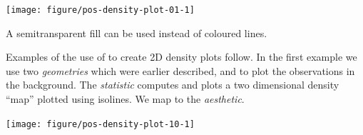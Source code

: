 \documentclass[krantz2]{krantz}\usepackage{knitr}%
\begin{document}
\begin{knitrout}\footnotesize
{}\color{fgcolor}\begin{kframe}
\begin{alltt}
    \hlopt{+}
  \hlstd{()}
\end{alltt}
\end{kframe}

{\centering \texttt{[image: figure/pos-density-plot-01-1]} 

}



\end{knitrout}

A semitransparent fill can be used instead of coloured lines.

\begin{knitrout}\footnotesize
{}\color{fgcolor}\begin{kframe}
\begin{alltt}
    \hlopt{+}
  \hlstd{(} \hlstd{=} \hlstd{)}
\end{alltt}
\end{kframe}
\end{knitrout}


Examples of the use of  to create 2D density plots follow. In the first example we use two \emph{geometries} which were earlier described,  and  to plot the observations in the background. The \emph{statistic} computes and plots a two dimensional density ``map'' plotted using isolines. We map  to the  \emph{aesthetic}.

\begin{knitrout}\footnotesize
{}\color{fgcolor}\begin{kframe}
\begin{alltt}
    \hlopt{+}
  \hlstd{()} \hlopt{+}
  \hlstd{()} \hlopt{+}
  \hlstd{()}
\end{alltt}
\end{kframe}

{\centering \texttt{[image: figure/pos-density-plot-10-1]} 

}



\end{knitrout}
\end{document}
